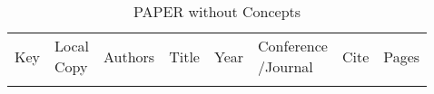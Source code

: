 {\scriptsize
\begin{longtable}{llp{5cm}p{10cm}rp{3cm}lr}
\rowcolor{white}\caption{PAPER without Concepts}\\ \toprule
\rowcolor{white}Key & \shortstack{Local\\Copy} & Authors & Title & Year & \shortstack{Conference\\/Journal} & Cite & Pages\\ \midrule
\endhead
\bottomrule
\endfoot
\end{longtable}
}

